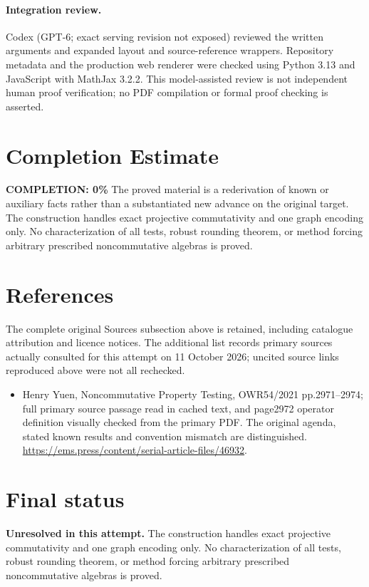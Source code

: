 \documentclass[11pt]{article}
\begin{document}
\paragraph{Integration review.} Codex (GPT-6; exact serving revision not exposed) reviewed the written arguments and expanded layout and source-reference wrappers. Repository metadata and the production web renderer were checked using Python 3.13 and JavaScript with MathJax 3.2.2. This model-assisted review is not independent human proof verification; no PDF compilation or formal proof checking is asserted.

\section{Completion Estimate}
\noindent\textbf{COMPLETION: 0\%}
The proved material is a rederivation of known or auxiliary facts rather than a substantiated new advance on the original target. The construction handles exact projective commutativity and one graph encoding only. No characterization of all tests, robust rounding theorem, or method forcing arbitrary prescribed noncommutative algebras is proved.
\section{References}
The complete original Sources subsection above is retained, including catalogue attribution and licence notices. The additional list records primary sources actually consulted for this attempt on 11 October 2026; uncited source links reproduced above were not all rechecked.
\begin{itemize}
\item Henry Yuen, Noncommutative Property Testing, OWR54/2021 pp.2971–2974; full primary source passage read in cached text, and page2972 operator definition visually checked from the primary PDF. The original agenda, stated known results and convention mismatch are distinguished. \url{https://ems.press/content/serial-article-files/46932}.
\end{itemize}
\section{Final status}
\textbf{Unresolved in this attempt.} The construction handles exact projective commutativity and one graph encoding only. No characterization of all tests, robust rounding theorem, or method forcing arbitrary prescribed noncommutative algebras is proved.
\end{document}
